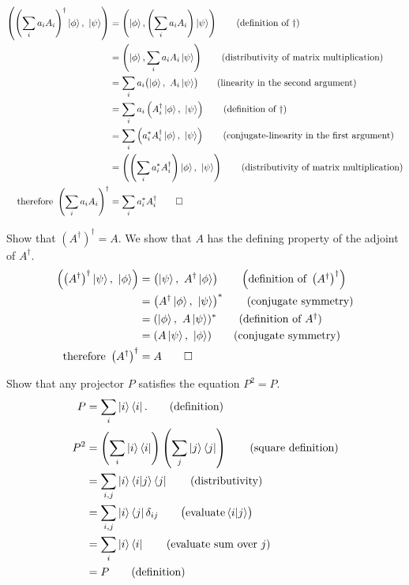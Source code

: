 \begin{align*}
	\left(\left(\sum_ia_i A_i\right)^\dagger \ket{\phi},\ \ket{\psi} \right)
	&= \left(\ket{\phi},\left(\sum_ia_i A_i\right) \ket{\psi}\right) \tag{definition of $\dagger$}\\
	&= \left(\ket{\phi}, \sum_ia_iA_i\ket{\psi}\right) \tag{distributivity of matrix multiplication}\\
	&= \sum_ia_i \bigl(\ket{\phi},\ A_i \ket{\psi}\bigr) \tag{linearity in the second argument}\\
	&= \sum_ia_i \left(A_i^\dagger \ket{\phi},\ \ket{\psi}\right) \tag{definition of $\dagger$}\\
	&= \sum_i\left(a_i^* A_i^\dagger \ket{\phi},\ \ket{\psi}\right) \tag{conjugate-linearity in the first argument}\\
	&= \left(\left(\sum_ia_i^* A_i^\dagger\right) \ket{\phi},\ \ket{\psi}\right) \tag{distributivity of matrix multiplication}\\
%
	\text{therefore } \left(\sum_ia_i A_i\right)^\dagger &= \sum_ia_i^* A_i^\dagger \tag*{$\square$}
\end{align*}

 Show that $\left(A^\dagger\right)^\dagger = A$.
\Soln We show that $A$ has the defining property of the adjoint of $A^\dagger$. 
\begin{align*}
	\left(\left(A^\dagger\right)^\dagger\ket{\psi},\ \ket{\phi} \right)
	&= \left(\ket{\psi},\ A^\dagger \ket{\phi}\right) \tag*{$\left(\text{definition of } \left(A^\dagger\right)^\dagger\right)$}\\
	&= \left(A^\dagger \ket{\phi},\ \ket{\psi}\right)^* \tag{conjugate symmetry}\\
	&= (\ket{\phi},\ A\ket{\psi})^* \tag{definition of $A^\dagger$}\\
	&= (A\ket{\psi},\ \ket{\phi}) \tag{conjugate symmetry}\\
	\text{therefore } \left(A^\dagger\right)^\dagger &= A \tag*{$\square$}
\end{align*}

 Show that any projector $P$ satisfies the equation $P^2 = P$.
\begin{align*}
	P &= \sum_i \ket{i}\bra{i}. \tag{definition}\\
	P^2 &= \left(\sum_i \ket{i}\bra{i}\right) \left(\sum_j \ket{j}\bra{j}\right) \tag{square definition}\\
	&= \sum_{i,j} \ket{i}\braket{i | j}\bra{j} \tag{distributivity}\\
	&= \sum_{i,j} \ket{i}\bra{j} \delta_{ij} \tag*{$\bigl(\text{evaluate} \braket{i | j}\bigr)$}\\
	&= \sum_i \ket{i}\bra{i}\tag{evaluate sum over $j$}\\
	&= P \tag{definition}
\end{align*}


